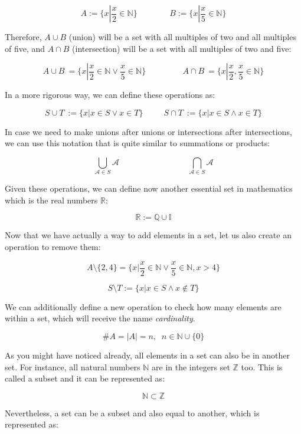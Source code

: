 \documentclass[12pt]{article}
\begin{document}
\[
    A:=\{x| \frac{x}{2} \in \mathbb{N} \} \;\;\;\;\;\;\;\;\;\;\;\;\;\; B:=\{x| \frac{x}{5} \in \mathbb{N} \}
\]

Therefore, \(A \cup B\) (union) will be a set with all multiples of two and all multiples of five, and \(A \cap B\) (intersection) will be a set with all multiples of two and five:

\[
    A \cup B\ = \{ x | \frac{x}{2}\in\mathbb{N} \vee  \frac{x}{5}\in\mathbb{N} \}\;\;\;\;\;\;\;\;\;\;\;\;\;\;\;\; A \cap B\ = \{ x | \frac{x}{2},\frac{x}{5}\in\mathbb{N} \}
\]

In a more rigorous way, we can define these operations as:

\[
    S \cup T\ := \{x|x \in S \vee x \in T \} \;\;\;\;\;\;\;\;\; S \cap T\ := \{x|x \in S \wedge x \in T \}
\]

In case we need to make unions after unions or intersections after intersections, we can use this notation that is quite similar to summations or products:

\[
    \bigcup_{\mathcal{A} \in S} \mathcal{A} \;\;\;\;\;\;\;\;\;\;\;\;\;\;\;\;\;\;\;\;\;\;\;\;\;\;\;\;\;\; \bigcap_{\mathcal{A} \in S} \mathcal{A}
\]

Given these operations, we can define now another essential set in mathematics which is the real numbers \(\mathbb{R}\):

\[
    \mathbb{R} := \mathbb{Q} \cup \mathbb{I}
\]

Now that we have actually a way to add elements in a set, let us also create an operation to remove them:

\[
    A \setminus \{2, 4\} = \{ x | \frac{x}{2}\in\mathbb{N} \vee  \frac{x}{5}\in\mathbb{N}, x > 4 \}
\]

\[
    S \setminus T := \{ x | x \in S \wedge x \notin T \}
\]

We can additionally define a new operation to check how many elements are within a set, which will receive the name \emph{cardinality}.

\[
    \#A = |A| = n, \;\; n \in \mathbb{N} \cup \{ 0 \}
\]

As you might have noticed already, all elements in a set can also be in another set. For instance, all natural numbers \(\mathbb{N}\) are in the integers set \(\mathbb{Z} \) too. This is called a subset and it can be represented as:

\[
    \mathbb{N} \subset \mathbb{Z}
\]

Nevertheless, a set can be a subset and also equal to another, which is represented as:
\end{document}
